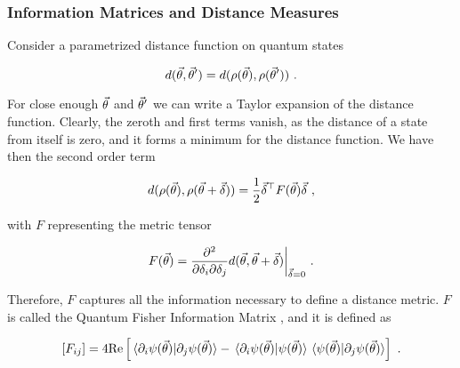 \subsubsection{Information Matrices and Distance Measures}
\label{subsubsec:distanceinfo}

Consider a parametrized distance function on quantum states 

\begin{equation}
    d(\vec{\theta}, \vec{\theta}') = d(\rho(\vec{\theta}), \rho(\vec{\theta}'))~.
\end{equation}

For close enough \(\vec{\theta}\) and \(\vec{\theta}'\) we can write a Taylor
expansion of the distance function. Clearly, the zeroth and first terms vanish,
as the distance of a state from itself is zero, and it forms a minimum for the
distance function. We have then the second order term

\begin{equation}
    d(\rho(\vec{\theta}), \rho(\vec{\theta}+\vec{\delta})) = \frac{1}{2} \vec{\delta}^\top F(\vec{\theta})\vec{\delta}~,
\end{equation}

with \(F\) representing the metric tensor

\begin{equation}
    F(\vec{\theta}) = \frac{\partial^2}{\partial\delta_i\partial\delta_j} d(\vec{\theta}, \vec{\theta} + \vec{\delta}) \bigg\vert_{\vec{\delta} = 0}~.
\end{equation}

Therefore, \(F\) captures all the information necessary to define a distance
metric. \(F\) is called the Quantum Fisher Information Matrix
\cite{meyer2021fisher}, and it is defined as

\begin{equation}
    \left[F_{ij}\right] = 4\text{Re} \left[\braket*{\partial_i\psi(\vec{\theta})}{\partial_j\psi(\vec{\theta})} - \braket*{\partial_i\psi(\vec{\theta})}{\psi(\vec{\theta})}\braket*{\psi(\vec{\theta})}{\partial_j\psi(\vec{\theta})}\right]~.
\end{equation}